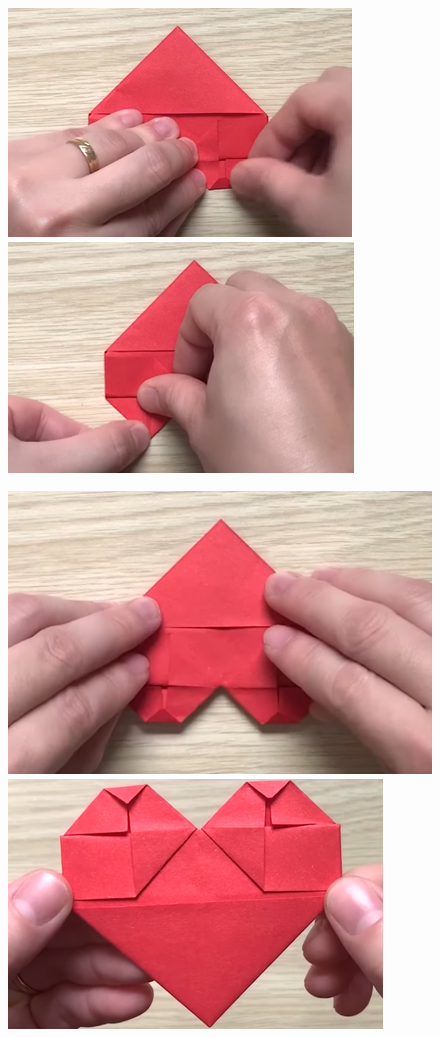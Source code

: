 \begin{multicols}{2}
\begin{figure}[H]
		\vspace*{1pt}
		\includegraphics[height= 0.327\linewidth]{39}
		\includegraphics[height= 0.327\linewidth]{40}
		
		\vspace*{1pt}
		\includegraphics[height= 0.327\linewidth]{41}
		\includegraphics[height= 0.327\linewidth]{42}
		

\end{figure}
\end{multicols}
